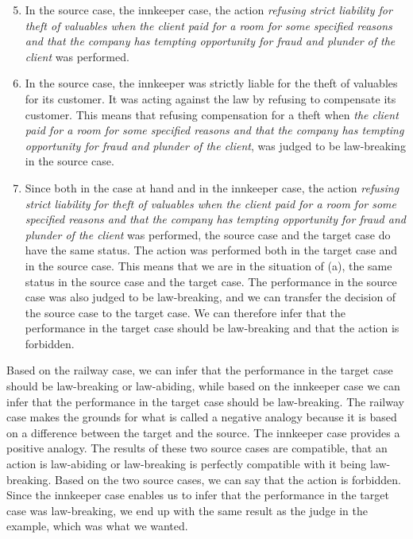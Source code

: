 			\begin{enumerate}[leftmargin=4\parindent]
				\setcounter{enumi}{4}
				
				\item In the source case, the innkeeper case, the action \textit{refusing strict liability for theft of valuables when the client paid for a room for some specified reasons and that the company has tempting opportunity for fraud and plunder of the client} was performed. 
				\item In the source case, the innkeeper was strictly  liable for the theft of valuables for its customer. It was acting against the law by refusing to compensate its customer. This means that refusing compensation for a theft when \textit{the client paid for a room for some specified reasons and that the company has tempting opportunity for fraud and plunder of the client}, was judged to be law-breaking in the source case.
				\item Since both in the case at hand and in the innkeeper case, the action \textit{refusing strict liability for theft of valuables when the client paid for a room for some specified reasons and that the company has tempting opportunity for fraud and plunder of the client} was performed, the source case and the target case do have the same status. The action was performed both in the target case and in the source case. This means that we are in the situation of (a), the same status in the source case and the target case. The performance in the source case was also judged to be law-breaking, and we can transfer the decision of the source case to the target case. We can therefore infer that the performance in the target case should be law-breaking and that the action is forbidden. 
			\end{enumerate}		
			
			Based on the railway case, we can infer that the performance in the target case should be law-breaking or law-abiding, while based on the innkeeper case we can infer that the performance in the target case should be law-breaking. The railway case makes the grounds for what is called a negative analogy because it is based on a difference between the target and the source. The innkeeper case provides a positive analogy. The results of these two source cases are compatible, that an action is law-abiding or law-breaking is perfectly compatible with it being law-breaking. Based on the two source cases, we can say that the action is forbidden. Since the innkeeper case enables us to infer that the performance in the target case was law-breaking, we end up with the same result as the judge in the example, which was what we wanted.
			
